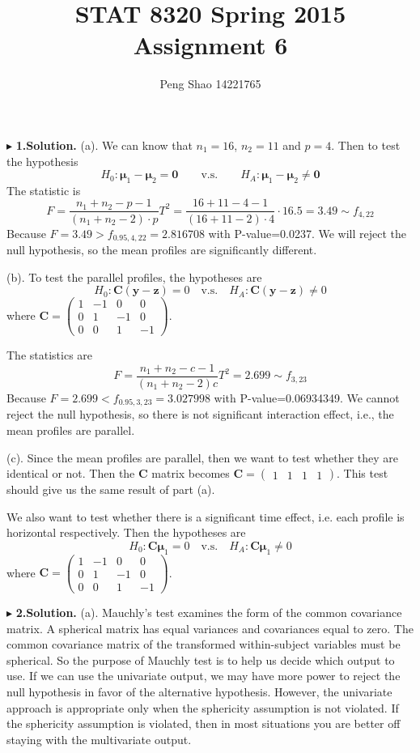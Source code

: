 \documentclass[letterpaper, 12pt]{article}
\newcommand{\lma}{\left(\begin{matrix}}
\newcommand{\rma}{\end{matrix}\right)}
\begin{document}
\title{STAT 8320 Spring 2015 Assignment 6}
\author{Peng Shao 14221765}
\maketitle
\indent




$\blacktriangleright$ \textbf{1.\quad Solution.} 
(a). We can know that $n_1=16$, $n_2=11$ and $p=4$. Then to test the hypothesis
$$
H_0:\bm{\mu}_1-\bm{\mu}_2=\bm{0}\qquad\text{v.s.}\qquad H_A:\bm{\mu}_1-\bm{\mu}_2\not=\bm{0}
$$
The statistic is
$$
F=\frac{n_1+n_2-p-1}{(n_1+n_2-2)\cdot p}T^2=\frac{16+11-4-1}{(16+11-2)\cdot 4}\cdot16.5=3.49\sim f_{4,22}
$$
Because $F=3.49>f_{0.95,4,22}=2.816708$ with P-value=0.0237. We will reject the null hypothesis, so the mean profiles are significantly different.

(b). To test the parallel profiles, the hypotheses are
$$
H_0:\bm{C}(\bm{y}-\bm{z})=0\quad\text{v.s.}\quad H_A: \bm{C}(\bm{y}-\bm{z})\not=0
$$where $\bm{C}=\lma 1 &-1 &0 &0\\ 0 &1 &-1 &0\\ 0 &0 &1 &-1\rma$. 

The statistics are
$$
F=\frac{n_1+n_2-c-1}{(n_1+n_2-2)c}T^2=2.699\sim f_{3,23}
$$
Because $F=2.699<f_{0.95,3,23}=3.027998$ with P-value=0.06934349. We cannot reject the null hypothesis, so there is not significant interaction effect, i.e., the mean profiles are parallel.

(c). Since the mean profiles are parallel, then we want to test whether they are identical or not. Then the $\bm{C}$ matrix becomes 
$
\bm{C}=\lma 1 &1 &1 &1\rma
$.
This test should give us the same result of part (a).

We also want to test whether there is a significant time effect, i.e. each profile is horizontal respectively. Then the hypotheses are
$$
H_0:\bm{C\mu}_1=0\quad\text{v.s.}\quad H_A:\bm{C\mu}_1\not=0
$$
where $\bm{C}=\lma 1 &-1 &0 &0\\ 0 &1 &-1 &0\\ 0 &0 &1 &-1\rma$.




$\blacktriangleright$ \textbf{2.\quad Solution.} 
(a). Mauchly's test examines the form of the common covariance matrix. A spherical matrix has equal variances and covariances equal to zero. The common covariance matrix of the transformed within-subject variables must be spherical. So the purpose of Mauchly test is to help us decide which output to use. If we can use the univariate output, we may have more power to reject the null hypothesis in favor of the alternative hypothesis. However, the univariate approach is appropriate only when the sphericity assumption is not violated. If the sphericity assumption is violated, then in most situations you are better off staying with the multivariate output.
\end{document}
